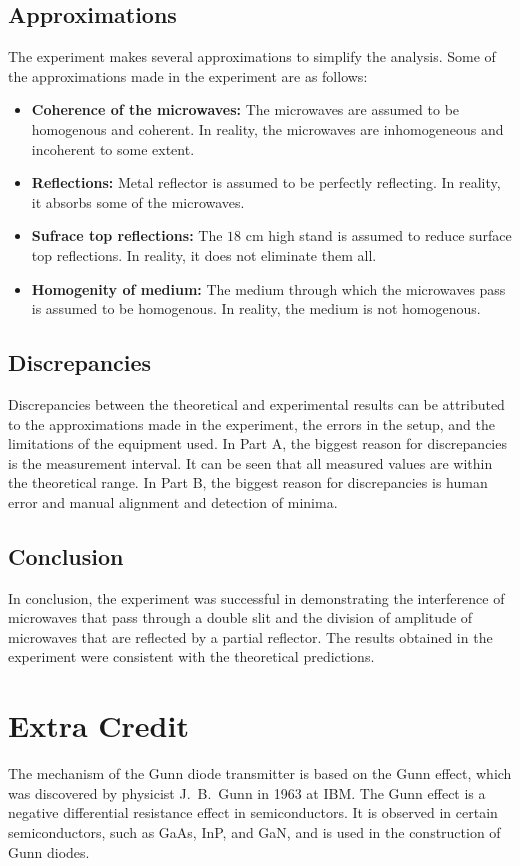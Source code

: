 \documentclass[10pt]{article}
\begin{document}
\subsection*{Approximations}

The experiment makes several approximations to simplify the analysis. Some of the approximations made in the experiment are as follows:
\begin{itemize}
  \item \textbf{Coherence of the microwaves:} The microwaves are assumed to be homogenous and coherent. In reality, the microwaves are inhomogeneous and incoherent to some extent.
  \item \textbf{Reflections:} Metal reflector is assumed to be perfectly reflecting. In reality, it absorbs some of the microwaves.
  \item \textbf{Sufrace top reflections:} The $18$ cm high stand is assumed to reduce surface top reflections. In reality, it does not eliminate them all.
  \item \textbf{Homogenity of medium:} The medium through which the microwaves pass is assumed to be homogenous. In reality, the medium is not homogenous.
\end{itemize}

\subsection*{Discrepancies}

Discrepancies between the theoretical and experimental results can be attributed to the approximations made in the experiment, the errors in the setup, and the limitations of the equipment used.
In Part A, the biggest reason for discrepancies is the measurement interval. It can be seen that all measured values are within the theoretical range. In Part B, the biggest reason for discrepancies is human error and manual alignment and detection of minima.

\subsection*{Conclusion} 

In conclusion, the experiment was successful in demonstrating the interference of microwaves that pass through a double slit and the division of amplitude of microwaves that are reflected by a partial reflector. The results obtained in the experiment were consistent with the theoretical predictions.

\section{Extra Credit}

The mechanism of the Gunn diode transmitter is based on the Gunn effect, which was discovered by physicist J.~B.~Gunn in 1963 at IBM. The Gunn effect is a negative differential resistance effect in semiconductors. It is observed in certain semiconductors, such as GaAs, InP, and GaN, and is used in the construction of Gunn diodes.

\printbibliography
\end{document}
